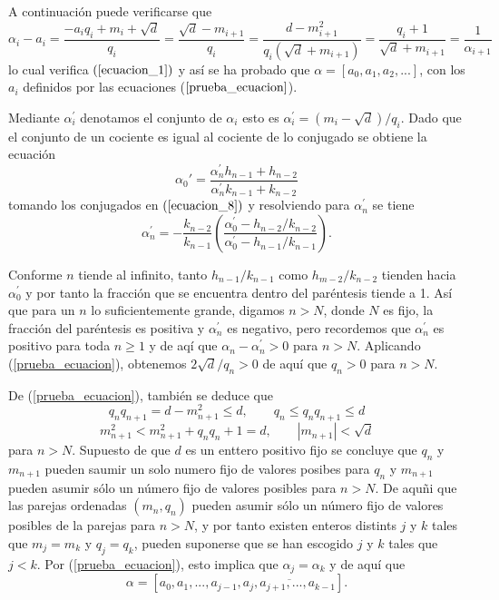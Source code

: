 \documentclass[11pt, article]{article}
\begin{document}
    A continuación puede verificarse que 
        \[
        \alpha_i-a_i=\dfrac{-a_iq_i+m_i+\sqrt{d}}{q_i}=\dfrac{\sqrt{d}-m_{i+1}}{q_i}=\dfrac{d-m_{i+1}^2}{q_i(\sqrt{d}+m_{i+1})}=\dfrac{q_i+1}{\sqrt{d}+m_{i+1}}=\dfrac{1}{\alpha_{i+1}}
        \]
    lo cual verifica $(\ref{ecuacion_1})$ y así se ha probado que $\alpha=[a_0,a_1,a_2,...]$, con los $a_i$ definidos por las ecuaciones ($\ref{prueba_ecuacion}$).
    
    Mediante $\alpha^{'}_{i}$ denotamos el conjunto de $\alpha_i$ esto es $\alpha^{'}_{i}=(m_i-\sqrt{d})/q_i$. Dado que el conjunto de un cociente es igual al cociente de lo conjugado se obtiene la ecuación
        \[
        \alpha_0{'}=\dfrac{\alpha_n^{'}h_{n-1}+h_{n-2}}{\alpha_n^{'}k_{n-1}+k_{n-2}}
        \]
    tomando los conjugados en $(\ref{ecuacion_8})$ y resolviendo para $\alpha_n^{'}$ se tiene
        \[
        \alpha_n^{'}=-\dfrac{k_{n-2}}{k_{n-1}}\left(\dfrac{\alpha_0^{'}-h_{n-2}/k_{n-2}}{\alpha_0^{'}-h_{n-1}/k_{n-1}}\right).
        \]
        
    Conforme $n$ tiende al infinito, tanto $h_{n-1}/k_{n-1}$ como $h_{m-2}/k_{n-2}$ tienden hacia $\alpha_0^{'}$ y por tanto la fracción que se encuentra dentro del paréntesis tiende a 1. Así que para un $n$ lo suficientemente grande, digamos $n>N$, 
    donde $N$ es fijo, la fracción del paréntesis es positiva y $\alpha_n^{'}$ es negativo, pero recordemos que $\alpha_n^{'}$ es positivo para toda
    $n\geq 1$ y de aqí que $\alpha_n - \alpha_n^{'}>0$ para $n>N$. Aplicando (\ref{prueba_ecuacion}), obtenemos $2 \sqrt{d}/q_{n} >0$
    de aquí que $q_n>0$ para $n>N$.
    
    De (\ref{prueba_ecuacion}), también se deduce que 
        \[
        q_nq_{n+1}=d-m^2_{n+1}\leq d, \qquad q_n\leq q_nq_{n+1}\leq d 
        \]
        \[
        m^2_{n+1} < m_{n+1}^2+q_n q_n+1=d, \qquad |m_{n+1}|<\sqrt{d}
        \]
    para $n>N$. Supuesto de que $d$ es un enttero positivo fijo se concluye que $q_n$ y $m_{n+1}$ pueden saumir un solo numero fijo de valores posibes para $q_n$ y $m_{n+1}$ pueden asumir sólo un número fijo de valores posibles para $n>N$. De aquñi que las parejas ordenadas $(m_n,q_n)$ pueden asumir sólo un número fijo de valores posibles de la parejas para $n>N$, y por tanto existen enteros distints $j$ y $k$ tales que $m_j=m_k$ y $q_j=q_k$, pueden suponerse que se han escogido $j$ y $k$ tales que $j<k$. Por (\ref{prueba_ecuacion}), esto implica que $\alpha_j=\alpha_k$ y de aquí que
        \[
        \alpha=[a_0,a_1,...,a_{j-1},\overline{a_j,a_{j+1},...,a_{k-1}}].
        \]
\end{document}
